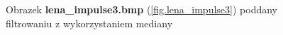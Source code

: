 \documentclass{classrep}
\begin{document}
\begin{figure}
{{  \label{fig.lena_impulse3_median_5x5}
 }
}
\caption{Obrazek \textbf{lena\_impulse3.bmp} (\ref{fig.lena_impulse3}) poddany filtrowaniu z wykorzystaniem mediany}
\label{fig.lena_impulse3_median}
\end{figure}

\begin{thebibliography}{99}
\end{thebibliography}
\end{document}
